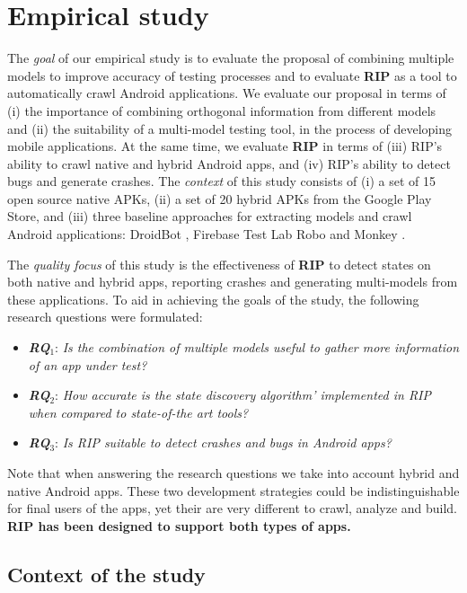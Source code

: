 \chapter{Empirical study}
\label{chapter4}
The \textit{goal} of our empirical study is to evaluate the proposal of combining multiple models to improve accuracy of testing processes and to evaluate \textbf{RIP} as a tool to automatically crawl Android applications. We evaluate our proposal in terms of (i) the importance of combining orthogonal information from different models and (ii) the suitability of a multi-model testing tool, in the process of developing mobile applications. At the same time, we evaluate \textbf{RIP} in terms of (iii) RIP's ability to crawl native and hybrid Android apps, and (iv) RIP's ability to detect bugs and generate crashes. The \textit{context} of this study consists of (i) a set of 15  open source native APKs, (ii) a set of 20 hybrid APKs from the Google Play Store, and (iii) three baseline approaches for extracting models and crawl Android applications: DroidBot \cite{Li:ICSE17}, Firebase Test Lab Robo \cite{firebase} and Monkey \cite{monkey}.

The \textit{quality focus} of this study is the effectiveness of \textbf{RIP} to detect  states on both native and hybrid apps, reporting crashes and generating multi-models from these applications. To aid in achieving the goals of the study, the following research questions were formulated:

\begin{itemize}
	\item \textit{\textbf{RQ$_1$}}: \textit{Is the combination of multiple models useful to gather more information of an app under test?}
	\item \textit{\textbf{RQ$_2$}}: \textit{How accurate is the state discovery algorithm' implemented in RIP when compared to state-of-the art tools?}
	\item \textit{\textbf{RQ$_3$}}: \textit{Is RIP suitable to detect crashes and bugs in Android apps?}
\end{itemize}
 
Note that when answering the research questions we take into account hybrid and native Android apps. These two development strategies could be indistinguishable for final users of the apps, yet their are very different to crawl, analyze and build. \textbf{RIP has been designed to support both types of apps.}

\section{Context of the study}

